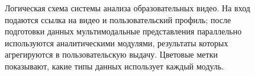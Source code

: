 \begin{figure}[!htbp]
{%
}

\caption{Логическая схема системы анализа образовательных видео.
На вход подаются ссылка на видео и пользовательский профиль; после подготовки данных
мультимодальные представления параллельно используются аналитическими модулями,
результаты которых агрегируются в пользовательскую выдачу.
Цветовые метки показывают, какие типы данных использует каждый модуль.}
\label{fig:system-logical-scheme}
\end{figure}